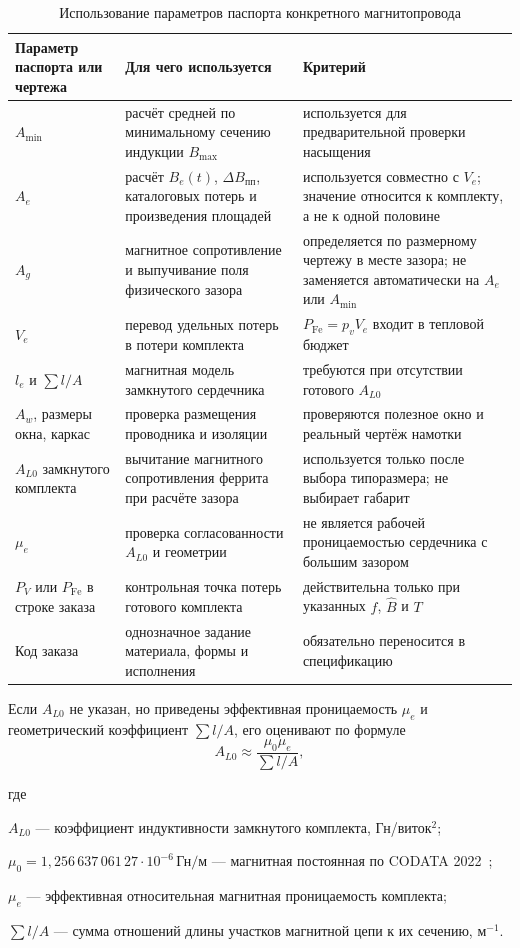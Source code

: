 \documentclass[14pt,a4paper]{extarticle}
\newenvironment{whereblock}
 {\par\noindent где\par
  \begin{list}{}{\setlength{\leftmargin}{12.5mm}
                  \setlength{\itemindent}{-12.5mm}
                  \setlength{\itemsep}{0pt}
                  \setlength{\parsep}{0pt}
                  \setlength{\topsep}{0pt}}}
 {\end{list}}
\newcommand{\whereitem}[2]{\item[] #1 --- #2}
\begin{document}
\begin{table}[H]
\caption{Использование параметров паспорта конкретного магнитопровода}
\label{tab:core-datasheet-map}
\centering
\scriptsize
\begin{tabularx}{\textwidth}{>{\raggedright\arraybackslash}p{30mm}
>{\raggedright\arraybackslash}p{45mm} X}
\toprule
Параметр паспорта или чертежа & Для чего используется & Критерий \\
\midrule
$A_{\min}$ &
расчёт средней по минимальному сечению индукции $B_{\max}$ &
используется для предварительной проверки насыщения \\
$A_e$ &
расчёт $B_e(t)$, $\Delta B_{\text{пп}}$, каталоговых потерь и произведения
площадей &
используется совместно с $V_e$; значение относится к комплекту, а не к
одной половине \\
$A_g$ &
магнитное сопротивление и выпучивание поля физического зазора &
определяется по размерному чертежу в месте зазора; не заменяется
автоматически на $A_e$ или $A_{\min}$ \\
$V_e$ &
перевод удельных потерь в потери комплекта &
$P_{\text{Fe}}=p_vV_e$ входит в тепловой бюджет \\
$l_e$ и $\sum l/A$ &
магнитная модель замкнутого сердечника &
требуются при отсутствии готового $A_{L0}$ \\
$A_w$, размеры окна, каркас &
проверка размещения проводника и изоляции &
проверяются полезное окно и реальный чертёж намотки \\
$A_{L0}$ замкнутого комплекта &
вычитание магнитного сопротивления феррита при расчёте зазора &
используется только после выбора типоразмера; не выбирает габарит \\
$\mu_e$ &
проверка согласованности $A_{L0}$ и геометрии &
не является рабочей проницаемостью сердечника с большим зазором \\
$P_V$ или $P_{\text{Fe}}$ в строке заказа &
контрольная точка потерь готового комплекта &
действительна только при указанных $f$, $\widehat B$ и $T$ \\
Код заказа &
однозначное задание материала, формы и исполнения &
обязательно переносится в спецификацию \\
\bottomrule
\end{tabularx}
\end{table}

Если $A_{L0}$ не указан, но приведены эффективная проницаемость
$\mu_e$ и геометрический коэффициент $\sum l/A$, его оценивают по
формуле
\begin{equation}
 A_{L0}\approx
 \frac{\mu_0\mu_e}{\displaystyle\sum l/A},
 \label{eq:al0-from-geometry}
\end{equation}
\begin{whereblock}
\whereitem{$A_{L0}$}{коэффициент индуктивности замкнутого комплекта,
Гн/виток$^2$;}
\whereitem{$\mu_0=1{,}256\,637\,061\,27\cdot10^{-6}\,\text{Гн/м}$}{магнитная
постоянная по CODATA 2022~\cite{codata};}
\whereitem{$\mu_e$}{эффективная относительная магнитная проницаемость
комплекта;}
\whereitem{$\sum l/A$}{сумма отношений длины участков магнитной цепи к их
сечению, м$^{-1}$.}
\end{whereblock}
\end{document}
